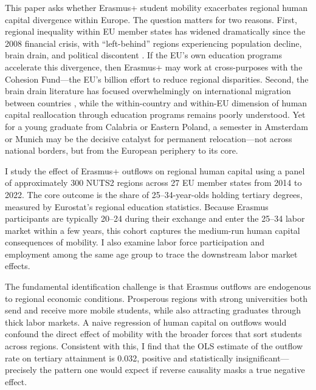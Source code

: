 \documentclass[12pt]{article}
\begin{document}
This paper asks whether Erasmus+ student mobility exacerbates regional human capital divergence within Europe. The question matters for two reasons. First, regional inequality within EU member states has widened dramatically since the 2008 financial crisis, with ``left-behind'' regions experiencing population decline, brain drain, and political discontent \citep{rodriguez_pose_2018, iammarino_rodriguez_pose_storper_2019}. If the EU's own education programs accelerate this divergence, then Erasmus+ may work at cross-purposes with the Cohesion Fund---the EU's  billion effort to reduce regional disparities. Second, the brain drain literature has focused overwhelmingly on international migration between countries \citep{docquier_rapoport_2012, beine_docquier_rapoport_2001, beine_docquier_rapoport_2008}, while the within-country and within-EU dimension of human capital reallocation through education programs remains poorly understood. Yet for a young graduate from Calabria or Eastern Poland, a semester in Amsterdam or Munich may be the decisive catalyst for permanent relocation---not across national borders, but from the European periphery to its core.

I study the effect of Erasmus+ outflows on regional human capital using a panel of approximately 300 NUTS2 regions across 27 EU member states from 2014 to 2022. The core outcome is the share of 25--34-year-olds holding tertiary degrees, measured by Eurostat's regional education statistics. Because Erasmus participants are typically 20--24 during their exchange and enter the 25--34 labor market within a few years, this cohort captures the medium-run human capital consequences of mobility. I also examine labor force participation and employment among the same age group to trace the downstream labor market effects.

The fundamental identification challenge is that Erasmus outflows are endogenous to regional economic conditions. Prosperous regions with strong universities both send and receive more mobile students, while also attracting graduates through thick labor markets. A naive regression of human capital on outflows would confound the direct effect of mobility with the broader forces that sort students across regions. Consistent with this, I find that the OLS estimate of the outflow rate on tertiary attainment is 0.032, positive and statistically insignificant---precisely the pattern one would expect if reverse causality masks a true negative effect.
\end{document}
